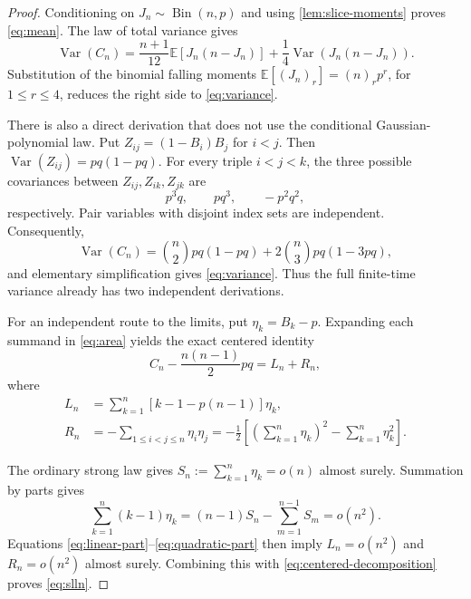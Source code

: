 \documentclass[11pt,a4paper]{amsart}
\theoremstyle{definition}
\theoremstyle{remark}
\newcommand{\Exp}{\mathbb E}
\begin{document}
\begin{proof}
Conditioning on $J_n\sim\operatorname{Bin}(n,p)$ and using
\cref{lem:slice-moments} proves \eqref{eq:mean}.  The law of total variance
gives
\[
 \operatorname{Var}(C_n)
 =\frac{n+1}{12}\Exp[J_n(n-J_n)]
 +\frac14\operatorname{Var}(J_n(n-J_n)).
\]
Substitution of the binomial falling moments
$\Exp[(J_n)_r]=(n)_rp^r$, for $1\leq r\leq4$, reduces the right side to
\eqref{eq:variance}.

There is also a direct derivation that does not use the conditional
Gaussian-polynomial law.  Put
$Z_{ij}=(1-B_i)B_j$ for $i<j$.  Then
$\operatorname{Var}(Z_{ij})=pq(1-pq)$.  For every triple $i<j<k$, the
three possible covariances between $Z_{ij},Z_{ik},Z_{jk}$ are
\[
 p^3q,\qquad pq^3,\qquad -p^2q^2,
\]
respectively.  Pair variables with disjoint index sets are independent.
Consequently,
\begin{equation}\label{eq:pair-covariance-variance}
 \operatorname{Var}(C_n)
 =\binom n2pq(1-pq)
  +2\binom n3pq(1-3pq),
\end{equation}
and elementary simplification gives \eqref{eq:variance}.  Thus the full
finite-time variance already has two independent derivations.

For an independent route to the limits, put $\eta_k=B_k-p$.  Expanding
each summand in \eqref{eq:area} yields the exact centered identity
\begin{equation}\label{eq:centered-decomposition}
 C_n-\frac{n(n-1)}2pq
 =L_n+R_n,
\end{equation}
where
\begin{align}
 L_n&=\sum_{k=1}^n[k-1-p(n-1)]\eta_k,
 \label{eq:linear-part}\\
 R_n&=-\sum_{1\leq i<j\leq n}\eta_i\eta_j
 =-\frac12\left[
 \left(\sum_{k=1}^n\eta_k\right)^2-\sum_{k=1}^n\eta_k^2
 \right].\label{eq:quadratic-part}
\end{align}

The ordinary strong law gives
$S_n:=\sum_{k=1}^n\eta_k=o(n)$ almost surely.  Summation by parts gives
\[
 \sum_{k=1}^n(k-1)\eta_k
 =(n-1)S_n-\sum_{m=1}^{n-1}S_m=o(n^2).
\]
Equations \eqref{eq:linear-part}--\eqref{eq:quadratic-part} then imply
$L_n=o(n^2)$ and $R_n=o(n^2)$ almost surely.  Combining this with
\eqref{eq:centered-decomposition} proves \eqref{eq:slln}.


\end{proof}
\end{document}
